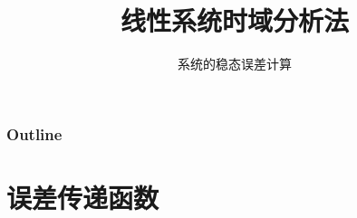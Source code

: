\documentclass{beamer}
\subtitle{系统的稳态误差计算}
\title{线性系统时域分析法}
\author{}
\date{}
\begin{document}
\maketitle

\begin{frame}
\frametitle{Outline}
\setcounter{tocdepth}{3}
\tableofcontents
\end{frame}














\section{误差传递函数}
\label{sec-1}
\end{document}
